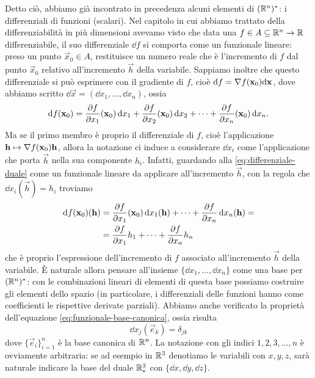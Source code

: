 Detto ciò, abbiamo già incontrato in precedenza alcuni elementi di $(\mathbb{R}^n)^*$: i differenziali di funzioni (scalari).
Nel capitolo in cui abbiamo trattato della differenziabilità in più dimensioni avevamo visto che data una $f\in A\subseteq\mathbb{R}^n\to\mathbb{R}$ differenziabile, il suo differenziale $\dd f$ si comporta come un funzionale lineare: preso un punto $\vec x_0\in A$, restituisce un numero reale che è l'incremento di $f$ dal punto $\vec x_0$ relativo all'incremento $\vec h$ della variabile.
Sappiamo inoltre che questo differenziale si può esprimere con il gradiente di $f$, cioè $\textup{d} f=\nabla f(\mathbf{x}_0)\textup{d}\mathbf{x}$, dove abbiamo scritto $\dd\vec x=(\dd x_1,\dots,\dd x_n)$, ossia
\begin{equation}
	\textup{d} f(\mathbf{x}_0)=\frac{\partial {f}}{\partial {x_1}}(\mathbf{x}_0)\,\textup{d} x_1+\frac{\partial {f}}{\partial {x_2}}(\mathbf{x}_0)\,\textup{d} x_2+\dots+\frac{\partial {f}}{\partial {x_n}}(\mathbf{x}_0)\,\textup{d} x_n.
	\label{eq:differenziale-duale}
\end{equation}
Ma se il primo membro è proprio il differenziale di $f$, cioè l'applicazione $\mathbf{h}\mapsto\nabla f(\mathbf{x}_0)\mathbf{h}$, allora la notazione ci induce a considerare $\dd x_i$ come l'applicazione che porta $\vec h$ nella sua componente $h_i$.
Infatti, guardando alla \eqref{eq:differenziale-duale} come un funzionale lineare da applicare all'incremento $\vec h$, con la regola che $\dd x_i(\vec h)=h_i$ troviamo
\begin{equation}
	\begin{split}
		\textup{d} f(\mathbf{x}_0)(\mathbf{h})&=\frac{\partial {f}}{\partial {x_1}}(\mathbf{x}_0)\,\textup{d} x_1(\mathbf{h})+\dots+\frac{\partial {f}}{\partial {x_n}}\,\textup{d} x_n(\mathbf{h})=\\
		&=\frac{\partial {f}}{\partial {x_1}}h_1+\dots+\frac{\partial {f}}{\partial {x_n}}h_n
	\end{split}
\end{equation}
che è proprio l'espressione dell'incremento di $f$ associato all'incremento $\vec h$ della variabile.
È naturale allora pensare all'insieme $\{\dd x_1,\dots,\dd x_n\}$ come una base per $(\mathbb{R}^n)^*$: con le combinazioni lineari di elementi di questa base possiamo costruire gli elementi dello spazio (in particolare, i differenziali delle funzioni hanno come coefficienti le rispettive derivate parziali).
Abbiamo anche verificato la proprietà dell'equazione \eqref{eq:funzionale-base-canonica}, ossia risulta
\begin{equation}
	\dd x_j(\vec e_k)=\delta_{jk}
\end{equation}
dove $\{\vec e_i\}_{i=1}^n$ è la base canonica di $\mathbb{R}^n$.
La notazione con gli indici $1,2,3,\dots,n$ è ovviamente arbitraria: se ad esempio in $\mathbb{R}^3$ denotiamo le variabili con $x,y,z$, sarà naturale indicare la base del duale $\mathbb{R}^3_*$ con $\{\dd x,\dd y,\dd z\}$.

